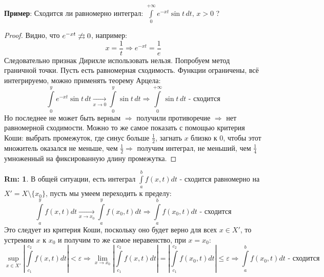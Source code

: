 \documentclass[12pt]{article}
\newcommand{\VE}{\varepsilon}
\theoremstyle{definition}
\newtheorem{rem}{Rm:}
\newcommand{\ddint}[2]{\displaystyle\int\limits_{#1}^{#2}}
\newcommand{\uconv}[1]{\overset{#1}{\rightrightarrows}}
\begin{document}
\textbf{Пример}: Сходится ли равномерно интеграл: $\ddint{0}{+\infty}e^{-xt}\sin{t} \, dt, \, x > 0$ ? 
\begin{proof}
	Видно, что $e^{-xt} \not\uconv{}0$, например: 
	$$
		x = \dfrac{1}{t} \Rightarrow e^{-xt} = \dfrac{1}{e}
	$$
	Следовательно признак Дирихле использовать нельзя. Попробуем метод граничной точки. Пусть есть равномерная сходимость. Функции ограничены, всё интегрируемо, можно применять теорему Арцела:
	$$
		\ddint{0}{y}e^{-xt}\sin{t} \, dt \xrightarrow[x \to 0]{} \ddint{0}{y}\sin{t} \, dt \Rightarrow \ddint{0}{+\infty}\sin{t} \, dt \text{ - сходится}
	$$
	Но последнее не может быть верным $\Rightarrow$ получили противоречие $\Rightarrow$ нет равномерной сходимости. Можно то же самое показать с помощью критерия Коши: выбрать промежуток, где синус больше $\tfrac{1}{2}$, загнать $x$ близко к $0$, чтобы этот множитель оказался не меньше, чем $\tfrac{1}{2} \Rightarrow$ получим интеграл, не меньший, чем $\tfrac{1}{4}$ умноженный на фиксированную длину промежутка.
\end{proof}
\begin{rem}
	В общей ситуации, есть интеграл $\ddint{a}{b}f(x,t)dt$ - сходится равномерно на $X' = X \setminus \{x_0\}$, пусть мы умеем переходить к пределу:
	$$
		\ddint{a}{y}f(x,t)dt \xrightarrow[x \to x_0]{} \ddint{a}{y}f(x_0,t)dt \Rightarrow \ddint{a}{b}f(x_0,t)dt \text{ - сходится}
	$$
	Это следует из критерия Коши, поскольку оно будет верно для всех $x \in X'$, то устремим $x$ к $x_0$ и получим то же самое неравенство, при $x = x_0$: 
	$$
		\sup\limits_{x \in X'}\left|\ddint{c_1}{c_2}f(x,t)dt\right| < \VE \Rightarrow \lim\limits_{x \to x_0}\left|\ddint{c_1}{c_2}f(x,t)dt\right|=  \left|\ddint{c_1}{c_2}f(x_0,t)dt\right| \leq \VE \Rightarrow \ddint{a}{b}f(x_0,t)dt \text{ - сходится}
	$$
\end{rem}
\end{document}
